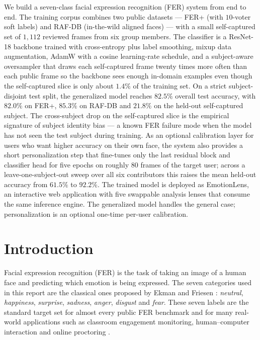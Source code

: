 \documentclass[12pt,a4paper]{article}
\makeatletter
\renewenvironment{abstract}{%
  \if@twocolumn
    \section*{\abstractname}%
  \else
    \small
    \begin{center}%
      {\bfseries \abstractname\vspace{-.5em}\vspace{\z@}}%
    \end{center}%
    \list{}{\leftmargin=0pt \rightmargin=0pt \listparindent=0pt \itemindent=0pt}\item\relax
  \fi}
{\if@twocolumn\else\endlist\fi}
\makeatother
\begin{document}
\tableofcontents
\newpage

\begin{abstract}
We build a seven-class facial expression recognition (FER)
system from end to end. The training corpus combines two
public datasets --- FER+ (with $10$-voter soft labels) and
RAF-DB (in-the-wild aligned faces) --- with a small
self-captured set of $1{,}112$ reviewed frames from six group
members. The classifier is a ResNet-18 backbone trained with
cross-entropy plus label smoothing, mixup data augmentation,
AdamW with a cosine learning-rate schedule, and a
subject-aware oversampler that draws each self-captured frame
twenty times more often than each public frame so the
backbone sees enough in-domain examples even though the
self-captured slice is only about $1.4\%$ of the training
set. On a strict subject-disjoint test split, the generalized
model reaches $82.5\%$ overall test accuracy, with $82.0\%$
on FER+, $85.3\%$ on RAF-DB and $21.8\%$ on the held-out
self-captured subject. The cross-subject drop on the
self-captured slice is the empirical signature of subject
identity bias --- a known FER failure mode when the model has
not seen the test subject during training. As an optional
calibration layer for users who want higher accuracy on their
own face, the system also provides a short personalization
step that fine-tunes only the last residual block and
classifier head for five epochs on roughly $80$ frames of the
target user; across a leave-one-subject-out sweep over all
six contributors this raises the mean held-out accuracy from
$61.5\%$ to $92.2\%$. The trained model is deployed as
EmotionLens, an interactive web application with five
swappable analysis lenses that consume the same inference
engine. The generalized model handles the general case;
personalization is an optional one-time per-user calibration.
\end{abstract}

\newpage

\section{Introduction}
\label{sec:intro}

Facial expression recognition (FER) is the task of taking an
image of a human face and predicting which emotion is being
expressed. The seven categories used in this report are the
classical ones proposed by
Ekman and Friesen \autocite{ekman1971constants}:
\emph{neutral}, \emph{happiness}, \emph{surprise},
\emph{sadness}, \emph{anger}, \emph{disgust} and \emph{fear}.
These seven labels are the standard target set for almost
every public FER benchmark and for many real-world applications
such as classroom engagement monitoring, human--computer
interaction and online proctoring
\autocite{savchenko2022hsemotion}.
\end{document}
